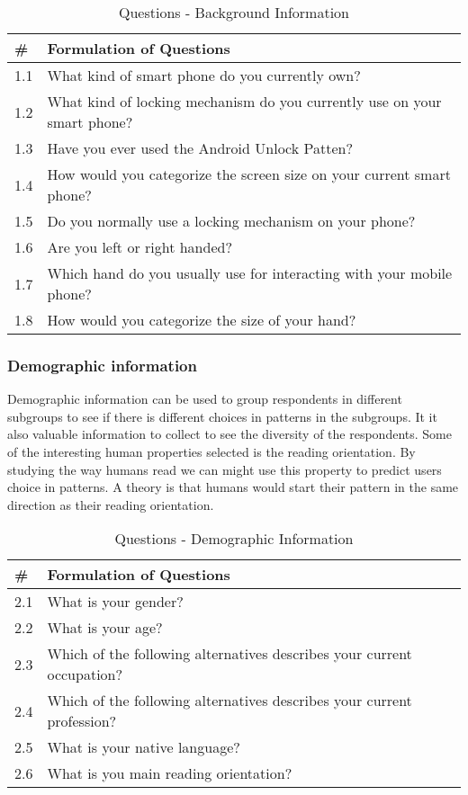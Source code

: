     \begin{table}[H]
      \begin{tabular}{| p{1cm} | p{10cm} |}
          \hline
          {\bf \#} & {\bf Formulation of Questions} \\ \hline
          1.1 & What kind of smart phone do you currently own? \\ \hline
          1.2 & What kind of locking mechanism do you currently use on your smart phone? \\ \hline
          1.3 & Have you ever used the Android Unlock Patten? \\ \hline
          1.4 & How would you categorize the screen size on your current smart phone? \\ \hline
          1.5 & Do you normally use a locking mechanism on your phone? \\ \hline
          1.6 & Are you left or right handed? \\ \hline
          1.7 & Which hand do you usually use for interacting with your mobile phone? \\ \hline
          1.8 & How would you categorize the size of your hand? \\ \hline
      \end{tabular}
      \caption{Questions - Background Information}
    \end{table}

    \subsubsection*{Demographic information}
    Demographic information can be used to group respondents in different subgroups to see if there is different choices in patterns in the subgroups. It it also valuable information to collect to see the diversity of the respondents. Some of the interesting human properties selected is the reading orientation. By studying the way humans read we can might use this property to predict users choice in patterns. A theory is that humans would start their pattern in the same direction as their reading orientation. 

    \begin{table}[H]
      \begin{tabular}{| p{1cm} | p{10cm} |}
        \hline
        {\bf \#} & {\bf Formulation of Questions} \\ \hline
        2.1 & What is your gender? \\ \hline
        2.2 & What is your age? \\ \hline
        2.3 & Which of the following alternatives describes your current occupation? \\ \hline
        2.4 & Which of the following alternatives describes your current profession? \\ \hline
        2.5 & {\color{red} What is your native language?} \\ \hline 
        2.6 & What is you main reading orientation? \\ \hline
      \end{tabular}
      \caption{Questions - Demographic Information}
    \end{table}

